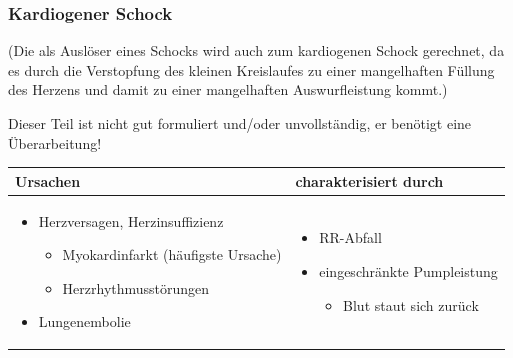 

\subsubsection{Kardiogener Schock}
\label{topic:schock-kardiogener}

(Die  als Auslöser eines Schocks wird
auch zum kardiogenen Schock gerechnet, da es durch die
Verstopfung des kleinen Kreislaufes zu einer mangelhaften
Füllung des Herzens und damit zu einer mangelhaften
Auswurfleistung kommt.)

{Dieser Teil ist nicht gut formuliert und/oder unvollständig, 
er benötigt eine Überarbeitung!}

\begin{center}
\begin{tabularx}{\linewidth}[H]{XX}
\toprule
Ursachen &
charakterisiert durch\\\midrule
\begin{itemize}
  \item Herzversagen, Herzinsuffizienz
  \begin{itemize}
    \item Myokardinfarkt (häufigste Ursache)
    \item Herzrhythmusstörungen
  \end{itemize}
  \item Lungenembolie
\end{itemize}
 &
 \begin{itemize}
   \item RR-Abfall
   \item eingeschränkte Pumpleistung
   \begin{itemize}
     \item Blut staut sich zurück
   \end{itemize}
 \end{itemize}
\\\bottomrule
\end{tabularx}
\end{center}

